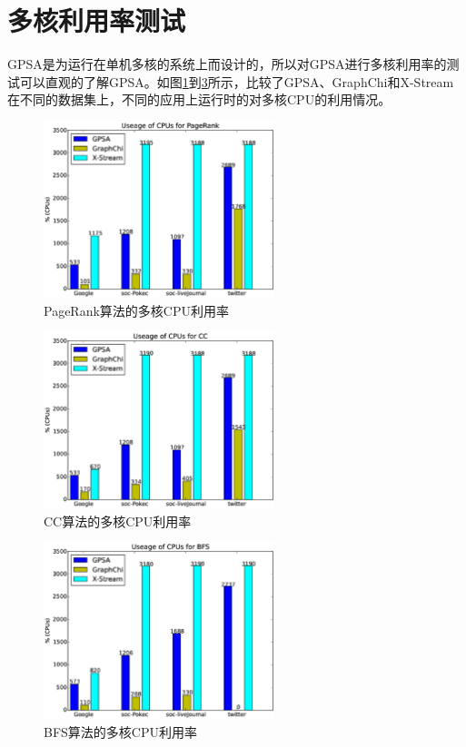 \section{多核利用率测试}
GPSA是为运行在单机多核的系统上而设计的，所以对GPSA进行多核利用率的测试可以直观的了解GPSA。如图\ref{res:usagepr}到\ref{res:usagebfs}所示，比较了GPSA、GraphChi和X-Stream在不同的数据集上，不同的应用上运行时的对多核CPU的利用情况。
\begin{figure}[htbp]
\centering
\includegraphics[width=0.6\textwidth,scale=0.8]{myfigures/usagepr2.eps}
\caption{PageRank算法的多核CPU利用率}
\label{res:usagepr}
\end{figure}
\begin{figure}[htbp]
\centering
\includegraphics[width=0.6\textwidth,scale=0.8]{myfigures/usagecc2.eps}
\caption{CC算法的多核CPU利用率}
\label{res:usagecc}
\end{figure}
\begin{figure}[htbp]
\centering
\includegraphics[width=0.6\textwidth,scale=0.8]{myfigures/usagebfs2.eps}
\caption{BFS算法的多核CPU利用率}
\label{res:usagebfs}
\end{figure}


